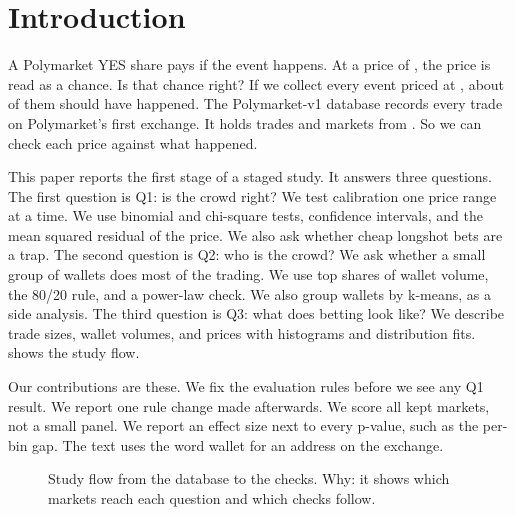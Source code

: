 \section{Introduction}\label{sec:intro}
A Polymarket YES share pays \PayoutDollar{} if the event happens.
At a price of \HookPrice, the price is read as a \HookPct{} chance.
Is that chance right?
If we collect every event priced at \HookPct, about \HookPct{} of them should have happened.
The Polymarket-v1 database records every trade on Polymarket's first exchange.
It holds \PaperTrades{} trades and \PaperMarkets{} markets from \PaperPeriod{} \citep{qin2026polymarketv1}.
So we can check each price against what happened.

This paper reports the first stage of a staged study.
It answers three questions.
The first question is Q1: is the crowd right?
We test calibration one price range at a time.
We use binomial and chi-square tests, confidence intervals, and the mean squared residual of the price.
We also ask whether cheap longshot bets are a trap.
The second question is Q2: who is the crowd?
We ask whether a small group of wallets does most of the trading.
We use top shares of wallet volume, the 80/20 rule, and a power-law check.
We also group wallets by k-means, as a side analysis.
The third question is Q3: what does betting look like?
We describe trade sizes, wallet volumes, and prices with histograms and distribution fits.
 shows the study flow.

Our contributions are these.
We fix the evaluation rules before we see any Q1 result.
We report one rule change made afterwards.
We score all \NMarketsKept{} kept markets, not a small panel.
We report an effect size next to every p-value, such as the per-bin gap.
The text uses the word wallet for an address on the exchange.

\begin{figure}[t]
\centering
{}
\caption{Study flow from the database to the checks. Why: it shows which markets reach each question and which checks follow.}%
\label{fig:flow}
\end{figure}
